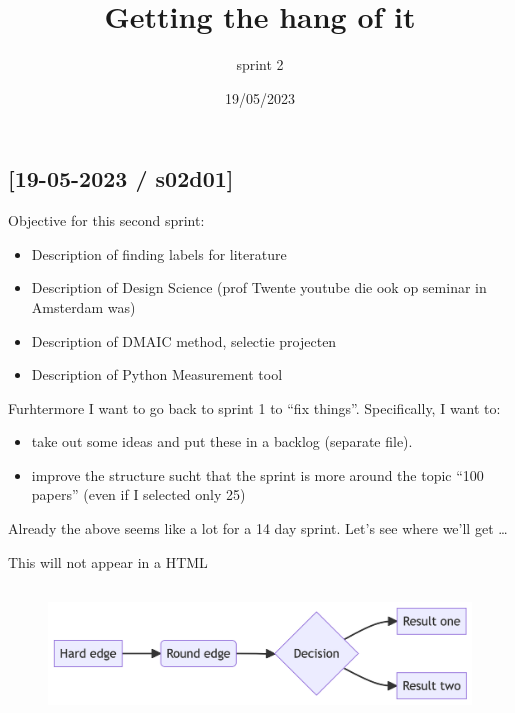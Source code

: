 \documentclass[
  letterpaper,
  DIV=11,
  numbers=noendperiod]{scrartcl}
\title{Getting the hang of it}
\subtitle{sprint 2}
\author{}
\date{19/05/2023}
\providecommand{\tightlist}{%
  \setlength{\itemsep}{0pt}\setlength{\parskip}{0pt}}\usepackage{longtable,booktabs,array}
\renewcommand*\contentsname{Table of contents}
\newcommand\contentsname{Table of contents}
\begin{document}
\maketitle
\ifdefined\Shaded\renewenvironment{Shaded}{\begin{tcolorbox}[sharp corners, boxrule=0pt, enhanced, borderline west={3pt}{0pt}{shadecolor}, interior hidden, breakable, frame hidden]}{\end{tcolorbox}}\fi

\renewcommand*\contentsname{Table of contents}
{
\hypersetup{linkcolor=}
\setcounter{tocdepth}{2}
\tableofcontents
}
\hypertarget{s02d01}{%
\subsection{{[}19-05-2023 / s02d01{]}}\label{s02d01}}

Objective for this second sprint:

\begin{itemize}
\tightlist
\item
  Description of finding labels for literature
\item
  Description of Design Science (prof Twente youtube die ook op seminar
  in Amsterdam was)
\item
  Description of DMAIC method, selectie projecten
\item
  Description of Python Measurement tool
\end{itemize}

Furhtermore I want to go back to sprint 1 to ``fix things''.
Specifically, I want to:

\begin{itemize}
\tightlist
\item
  take out some ideas and put these in a backlog (separate file).
\item
  improve the structure sucht that the sprint is more around the topic
  ``100 papers'' (even if I selected only 25)
\end{itemize}

Already the above seems like a lot for a 14 day sprint. Let's see where
we'll get \ldots{}

This will not appear in a HTML

\begin{figure}[H]

{\centering \includegraphics[width=5.74in,height=1.4in]{s3_methods_files/figure-latex/mermaid-figure-1.png}

}

\end{figure}
\end{document}
